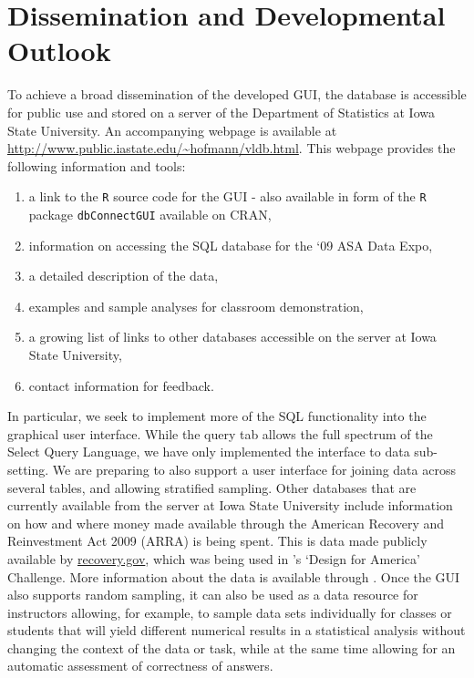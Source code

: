 \documentclass[11pt]{tise_style}
\newcommand{\red}[1]{{\color{red} #1}}
\begin{document}

\section{{Dissemination and Developmental Outlook}}
To achieve a broad dissemination of the developed GUI, the database is accessible for public use and stored on a server of the Department of Statistics at Iowa State University. An accompanying webpage is available at \url{http://www.public.iastate.edu/~hofmann/vldb.html}.
This webpage provides the following information and tools: 
\begin{enumerate} 
\item a link to the {\tt R} source code for the GUI - also available in form of the {\tt R} package {\tt dbConnectGUI} available on CRAN, 
\item information on accessing the SQL database for the `09 ASA Data Expo, 
\item a detailed description of the data,  
\item examples and sample analyses for classroom demonstration, 
\item a growing list of links to other databases accessible on the server at Iowa State University, 
\item contact information for feedback.
\end{enumerate}
In particular, we seek to implement more of the SQL functionality into the graphical user interface. While the query tab allows the full spectrum of the Select Query Language, we have only implemented the interface to data sub-setting. We are preparing to also support a user interface for joining data across several tables, and allowing stratified sampling. 
Other databases that are currently available from the server at Iowa State University include information on how and where money made available through the American Recovery and Reinvestment Act 2009 (ARRA) is being spent. This is data made publicly available by \url{recovery.gov}, which was being used in \citet{designforamerica}'s `Design for America' Challenge. More information about the data is available through \citet{arra}.
Once the GUI also supports random sampling, it can also be used as a data resource for instructors allowing, for example, to sample data sets individually for classes or students that will yield different numerical results in a statistical analysis without changing the context of the data or task, while at the same time allowing for an automatic assessment of correctness of answers.    
\end{document}
